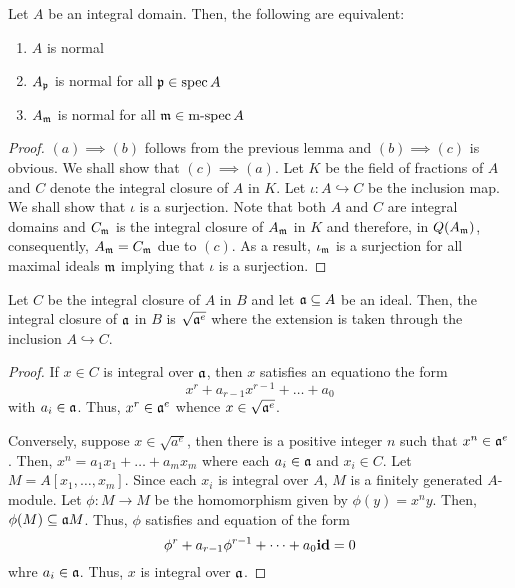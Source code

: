 \begin{proposition}
    Let $A$ be an integral domain. Then, the following are equivalent: 
    \begin{enumerate}[label=(\alph*)]
        \item $A$ is normal 
        \item $A_\mathfrak p$ is normal for all $\mathfrak p\in\operatorname{spec} A$ 
        \item $A_\mathfrak m$ is normal for all $\mathfrak m\in\operatorname{m-spec} A$
    \end{enumerate}
\end{proposition}
\begin{proof}
    $(a)\implies(b)$ follows from the previous lemma and $(b)\implies(c)$ is obvious. We shall show that $(c)\implies(a)$. Let $K$ be the field of fractions of $A$ and $C$ denote the integral closure of $A$ in $K$. Let $\iota:A\hookrightarrow C$ be the inclusion map. We shall show that $\iota$ is a surjection. Note that both $A$ and $C$ are integral domains and $C_\mathfrak m$ is the integral closure of $A_\mathfrak m$ in $K$ and therefore, in $Q(A_\mathfrak m)$, consequently, $A_\mathfrak m = C_\mathfrak m$ due to $(c)$. As a result, $\iota_\mathfrak m$ is a surjection for all maximal ideals $\mathfrak m$ implying that $\iota$ is a surjection.
\end{proof}

\begin{lemma}
    Let $C$ be the integral closure of $A$ in $B$ and let $\mathfrak a\subseteq A$ be an ideal. Then, the integral closure of $\mathfrak a$ in $B$ is $\sqrt{\mathfrak a^e}$ where the extension is taken through the inclusion $A\hookrightarrow C$.
\end{lemma}
\begin{proof}
    If $x\in C$ is integral over $\mathfrak a$, then $x$ satisfies an equationo the form 
    \begin{equation*}
        x^r + a_{r - 1}x^{r - 1} + \dots + a_0
    \end{equation*}
    with $a_i\in\mathfrak a$. Thus, $x^r\in\mathfrak a^e$ whence $x\in\sqrt{\mathfrak a^e}$.

    Conversely, suppose $x\in\sqrt{a^e}$, then there is a positive integer $n$ such that $x^n\in\mathfrak a^e$. Then, $x^n = a_1x_1 + \dots + a_mx_m$ where each $a_i\in\mathfrak a$ and $x_i\in C$. Let $M = A[x_1,\dots,x_m]$. Since each $x_i$ is integral over $A$, $M$ is a finitely generated $A$-module. Let $\phi: M\to M$ be the homomorphism given by $\phi(y) = x^ny$. Then, $\phi(M)\subseteq\mathfrak a M$. Thus, $\phi$ satisfies and equation of the form 
    \begin{equation*}
        \phi^r + a_{r - 1}\phi^{r - 1} + \dots + a_0\mathbf{id} = 0
    \end{equation*}
    whre $a_i\in\mathfrak a$. Thus, $x$ is integral over $\mathfrak a$.
\end{proof}

